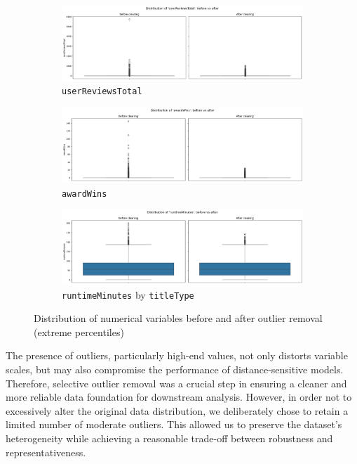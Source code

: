 \documentclass[10pt]{article}
\begin{document}
\begin{figure}[H]
    \centering
    \begin{subfigure}{0.45\textwidth}
        \centering
        \includegraphics[width=0.85\linewidth]{userReviewsTotal_before_after.png}
        \caption{\texttt{userReviewsTotal}}
    \end{subfigure}
    \hfill
    \begin{subfigure}{0.45\textwidth}
        \centering
        \includegraphics[width=0.85\linewidth]{awardWins_before_after.png}
        \caption{\texttt{awardWins}}
    \end{subfigure}

    \vspace{0.5cm}

    \begin{subfigure}{0.45\textwidth}
        \centering
        \includegraphics[width=0.85\linewidth]{runtimeMinutes_before_after.png}
        \caption{\texttt{runtimeMinutes} by \texttt{titleType}}
    \end{subfigure}

    \caption{Distribution of numerical variables before and after outlier removal (extreme percentiles)}
    \label{fig:outliers-before-after}
\end{figure}

The presence of outliers, particularly high-end values, not only distorts variable scales, but may also compromise the performance of distance-sensitive models. Therefore, selective outlier removal was a crucial step in ensuring a cleaner and more reliable data foundation for downstream analysis. However, in order not to excessively alter the original data distribution, we deliberately chose to retain a limited number of moderate outliers. This allowed us to preserve the dataset's heterogeneity while achieving a reasonable trade-off between robustness and representativeness.
\end{document}
